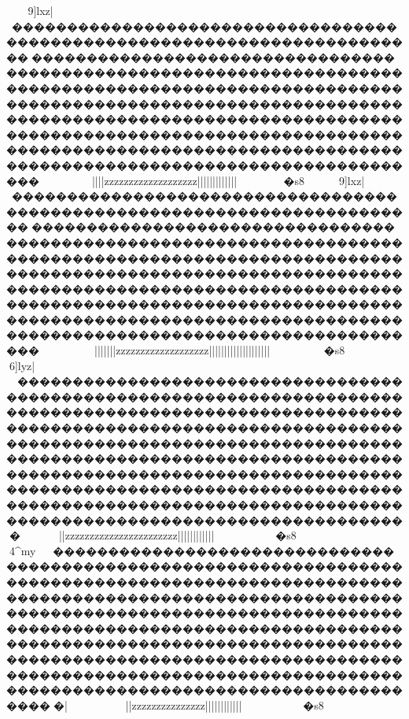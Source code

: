 {{{{{{{{{{{{{{{{{{{{{{{{{{{{{{{{{{{{{{{{{{{{{{{{{{{{{{{{{{{{{{{{{{{{{{{{{{{{{{{{{{{{{{{{{{{{{{{{{{{{{{{{{{{{{{{{{{{{{{{{{{{{{{{{{{{{{{{{{{{{{{{{{{{{{{{{{{{{{{{{{{{{{{{{{{{{{{{{{{{{{{{{{{{{{{{{{{{{{{{{{{{{{{{{{{{{{{{{{{{{{{{{{{{{{{{{{{{{{{{{{{{{{{{{{{{{{{{{{{{{{{{{{{{{{{{{{{{{{{{{{{{{{{{{{{{{{{{{{{{{{{{{{{{{{{{{{{{{{{{{{{{{{{{{{{{{{{{{{{{{{{{{{{{{{{{{{{{{{{{{{{{{{{{{{{{{{{{{{{{{{{{{{{{{{{{{{{{{{{{{{{{{{{{{{{{{{{{{{{{{{{{{{{{{{{{{{{{{{{{{{{{{{{{{{{{{{{{{{{{{{{{{{{{{{{{{{{{{{{{{{{{{{{{{{{{{{{{{{{{{{{{{{{{{{{{{{{{{{{{{{{{{{{{{{{{{{{{{{{9]lxz|}}}~�������������������������������������������������������������������������������������������������������������������������������������������������������������������������������������������������������������������������������������������������������������������������������������������������������������������������������������������������������������������������~~~~~~~~~}}{{{|{{|||{{{zzzzzz{{zzzzzzzzzzzzz{{{{|||||||||}}}}}}}}||||}}}}}}}}}}}}~~~~�s8
9]lxz|}}}~�������������������������������������������������������������������������������������������������������������������������������������������������������������������������������������������������������������������������������������������������������������������������������������������������������������������������������������������������������������������������~~~~~~~~~~}}||||{{|||{{{zzzzzz{{zzzzzzzzzzzzz{{{{{||||||||||||||||||||}}}}}}}}}}}}~~~~~~~�s8

6]lyz|}}~~������������������������������������������������������������������������������������������������������������������������������������������������������������������������������������������������������������������������������������������������������������������������������������������������������������������������������������������������������������������������~~~}}}}~~~~}}}}}||{{{{{{{zzzzzz{{zzzzzzzzzzzzzzzzz{{{{{{{{{||||||||{{{{||||}}}}}}}}~~~~~~~~~~�s8

4^my{}~~������������������������������������������������������������������������������������������������������������������������������������������������������������������������������������������������������������������������������������������������������������������������������������������������������������������������������������������������������������������������|~}}}}~~~~~~~~~||{{{{{{{{{{{{{{{zzzz{{zzzzzzzzzzz{{{{{{{{{||||||||{{{{||||}}}}}}}}~~~~~~~~~~�s8

}}}}}}}}}}}}}}}}}}}}}}}}}}}}}}}}}}}}}}}}}}}}}}}}}}}}}}}}}}}}}}}}}}}}}}}}}}}}}}}}}}}}}}}}}}}}}}}}}}}}}}}}}}}}}}}}}}}}}}}}}}}}}}}}}}}}}}}}}}}}}}}}}}}}}}}}}}}}}}}}}}}}}}}}}}}}}}}}}}}}}}}}}}}}}}}}}}}}}}}}}}}}}}}}}}}}}}}}}}}}}}}}}}}}}}}}}}}}}}}}}}}}}}}}}}}}}}}}}}}}}}}}}}}}}}}}}}}}}}}}}}}}}}}}}}}}}}}}}}}}}}}}}}}}}}}}}}}}}}}}}}}}}}}}}}}}}}}}}}}}}}}}}}}}}}}}}}}}}}}}}}}}}}}}}}}}}}}}}}}}}}}}}}}}}}}}}}}}}}}}}}}}}}}}}}}}}}}}}}}}}}}}}}}}}}}}}}}}}}}}}}}}}}}}}}}}}}}}}}}}}}}}}}}}}}}}}}}}}}}}}}}}}}}}}}}}}}}}}}}}}}}}}}}}}}}}}}}}}}}}}}}}}}}}}}}}}}}}}}}}}}}
